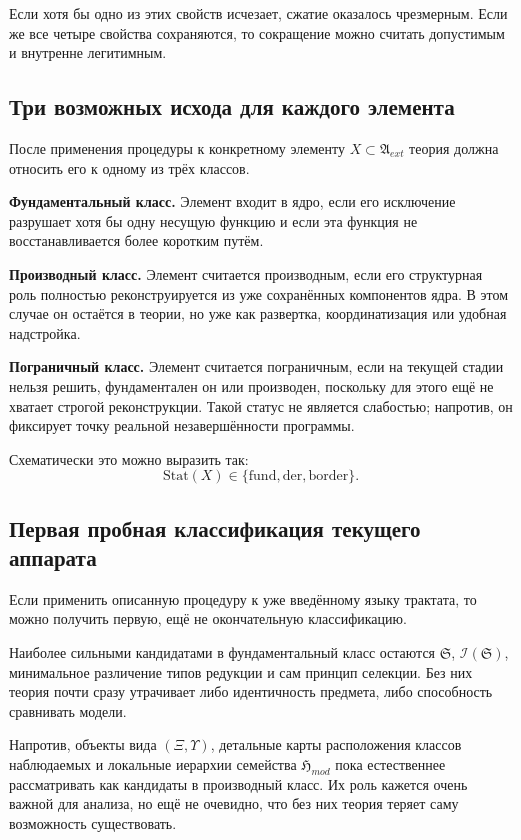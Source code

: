 \documentclass[12pt,a4paper]{article}
\begin{document}
Если хотя бы одно из этих свойств исчезает, сжатие оказалось чрезмерным. Если же все четыре свойства сохраняются, то сокращение можно считать допустимым и внутренне легитимным.

\subsection{Три возможных исхода для каждого элемента}

После применения процедуры к конкретному элементу \(X\subset \mathfrak{A}_{ext}\) теория должна относить его к одному из трёх классов.

\textbf{Фундаментальный класс.} Элемент входит в ядро, если его исключение разрушает хотя бы одну несущую функцию и если эта функция не восстанавливается более коротким путём.

\textbf{Производный класс.} Элемент считается производным, если его структурная роль полностью реконструируется из уже сохранённых компонентов ядра. В этом случае он остаётся в теории, но уже как развертка, координатизация или удобная надстройка.

\textbf{Пограничный класс.} Элемент считается пограничным, если на текущей стадии нельзя решить, фундаментален он или производен, поскольку для этого ещё не хватает строгой реконструкции. Такой статус не является слабостью; напротив, он фиксирует точку реальной незавершённости программы.

Схематически это можно выразить так:
\begin{equation}
\mathrm{Stat}(X) \in \{\mathrm{fund},\mathrm{der},\mathrm{border}\}.
\end{equation}

\subsection{Первая пробная классификация текущего аппарата}

Если применить описанную процедуру к уже введённому языку трактата, то можно получить первую, ещё не окончательную классификацию.

Наиболее сильными кандидатами в фундаментальный класс остаются \(\mathfrak{S}\), \(\mathcal{I}(\mathfrak{S})\), минимальное различение типов редукции и сам принцип селекции. Без них теория почти сразу утрачивает либо идентичность предмета, либо способность сравнивать модели.

Напротив, объекты вида \((\Xi,\Upsilon)\), детальные карты расположения классов наблюдаемых и локальные иерархии семейства \(\mathfrak{H}_{mod}\) пока естественнее рассматривать как кандидаты в производный класс. Их роль кажется очень важной для анализа, но ещё не очевидно, что без них теория теряет саму возможность существовать.
\end{document}
